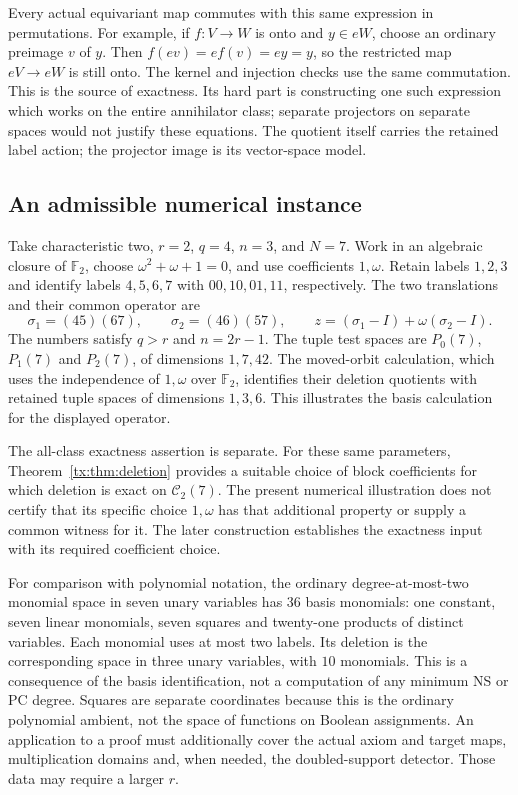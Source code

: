 Every actual equivariant map commutes with this same expression
in permutations. For example, if $f:V\to W$ is onto and
$y\in eW$, choose an ordinary preimage $v$ of $y$. Then
$f(ev)=e f(v)=ey=y$, so the restricted map $eV\to eW$
is still onto. The kernel and injection checks use the same
commutation. This is the source of exactness. Its hard part is
constructing one such expression which works on the entire
annihilator class; separate projectors on separate spaces would
not justify these equations. The quotient itself carries the
retained label action; the projector image is its vector-space
model.

\subsection*{An admissible numerical instance}
Take characteristic two, $r=2$, $q=4$, $n=3$, and $N=7$.
Work in an algebraic closure of $\mathbb F_2$, choose
$\omega^2+\omega+1=0$, and use coefficients $1,\omega$.
Retain labels $1,2,3$ and identify labels $4,5,6,7$ with
$00,10,01,11$, respectively. The two translations and their
common operator are
\[
 \sigma_1=(45)(67),\qquad\sigma_2=(46)(57),\qquad
 z=(\sigma_1-I)+\omega(\sigma_2-I).
\]
The numbers satisfy $q>r$ and $n=2r-1$.
The tuple test spaces are $P_0(7)$, $P_1(7)$ and $P_2(7)$,
of dimensions $1,7,42$. The moved-orbit calculation, which uses
the independence of $1,\omega$ over $\mathbb F_2$, identifies
their deletion quotients with retained tuple spaces of dimensions
$1,3,6$. This illustrates the basis calculation for the displayed
operator.

The all-class exactness assertion is separate. For these same
parameters, Theorem~\ref{tx:thm:deletion} provides a suitable choice
of block coefficients for which deletion is exact on
$\mathcal C_2(7)$. The present numerical illustration does not
certify that its specific choice $1,\omega$ has that additional
property or supply a common witness for it. The later construction
establishes the exactness input with its required coefficient choice.

For comparison with polynomial notation, the ordinary degree-at-most-two
monomial space in seven unary variables has $36$ basis monomials:
one constant, seven linear monomials, seven squares and twenty-one
products of distinct variables. Each monomial uses at most two
labels. Its deletion is the corresponding space in three unary
variables, with $10$ monomials. This is a consequence of the basis
identification, not a computation of any minimum NS or PC degree.
Squares are separate coordinates because this is the ordinary
polynomial ambient, not the space of functions on Boolean assignments.
An application to a proof must additionally cover the actual axiom
and target maps, multiplication domains and, when needed, the
doubled-support detector. Those data may require a larger $r$.

